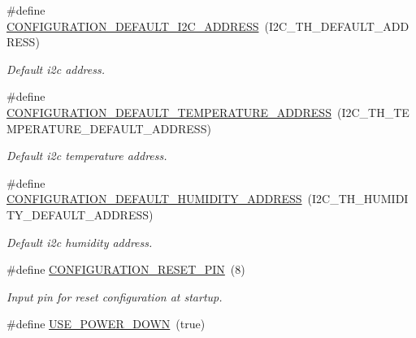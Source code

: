 \begin{DoxyCompactItemize}
\#define \hyperlink{i2c-th-config_8h_a25fb304ef264a84353f1d4cfc61128e9}{C\+O\+N\+F\+I\+G\+U\+R\+A\+T\+I\+O\+N\+\_\+\+D\+E\+F\+A\+U\+L\+T\+\_\+\+I2\+C\+\_\+\+A\+D\+D\+R\+E\+SS}~(I2\+C\+\_\+\+T\+H\+\_\+\+D\+E\+F\+A\+U\+L\+T\+\_\+\+A\+D\+D\+R\+E\+SS)
\begin{DoxyCompactList}\small\item\em Default i2c address. \end{DoxyCompactList}\item 
\mbox{\label{i2c-th-config_8h_afd732a8bd16aa3939928851656adb365}} 
\#define \hyperlink{i2c-th-config_8h_afd732a8bd16aa3939928851656adb365}{C\+O\+N\+F\+I\+G\+U\+R\+A\+T\+I\+O\+N\+\_\+\+D\+E\+F\+A\+U\+L\+T\+\_\+\+T\+E\+M\+P\+E\+R\+A\+T\+U\+R\+E\+\_\+\+A\+D\+D\+R\+E\+SS}~(I2\+C\+\_\+\+T\+H\+\_\+\+T\+E\+M\+P\+E\+R\+A\+T\+U\+R\+E\+\_\+\+D\+E\+F\+A\+U\+L\+T\+\_\+\+A\+D\+D\+R\+E\+SS)
\begin{DoxyCompactList}\small\item\em Default i2c temperature address. \end{DoxyCompactList}\item 
\mbox{\label{i2c-th-config_8h_a6d8fda545e952788d1692c9395b2ff2d}} 
\#define \hyperlink{i2c-th-config_8h_a6d8fda545e952788d1692c9395b2ff2d}{C\+O\+N\+F\+I\+G\+U\+R\+A\+T\+I\+O\+N\+\_\+\+D\+E\+F\+A\+U\+L\+T\+\_\+\+H\+U\+M\+I\+D\+I\+T\+Y\+\_\+\+A\+D\+D\+R\+E\+SS}~(I2\+C\+\_\+\+T\+H\+\_\+\+H\+U\+M\+I\+D\+I\+T\+Y\+\_\+\+D\+E\+F\+A\+U\+L\+T\+\_\+\+A\+D\+D\+R\+E\+SS)
\begin{DoxyCompactList}\small\item\em Default i2c humidity address. \end{DoxyCompactList}\item 
\mbox{\label{i2c-th-config_8h_ae90da4786d4ba14563681879dba4d39c}} 
\#define \hyperlink{i2c-th-config_8h_ae90da4786d4ba14563681879dba4d39c}{C\+O\+N\+F\+I\+G\+U\+R\+A\+T\+I\+O\+N\+\_\+\+R\+E\+S\+E\+T\+\_\+\+P\+IN}~(8)
\begin{DoxyCompactList}\small\item\em Input pin for reset configuration at startup. \end{DoxyCompactList}\item 
\mbox{\label{i2c-th-config_8h_a9ace81994cbeb6153f9dd5adf0e6dbee}} 
\#define \hyperlink{i2c-th-config_8h_a9ace81994cbeb6153f9dd5adf0e6dbee}{U\+S\+E\+\_\+\+P\+O\+W\+E\+R\+\_\+\+D\+O\+WN}~(true)

\end{DoxyCompactItemize}
